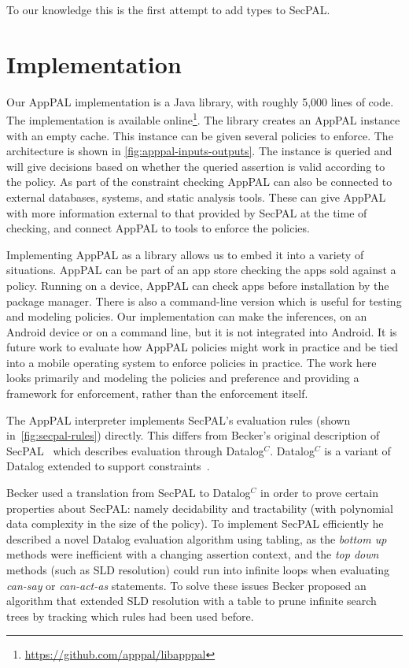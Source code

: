 \documentclass[thesis.tex]{subfiles}
\begin{document}
To our knowledge this is the first attempt to add types to SecPAL.


\section{Implementation}
\label{sec:implementation}

Our AppPAL implementation is a Java library, with roughly 5,000 lines of code.
The implementation is available
online\footnote{\url{https://github.com/apppal/libapppal}}. The library creates
an AppPAL instance with an empty cache. This instance can be given several policies to enforce. The
architecture is shown in \autoref{fig:apppal-inputs-outputs}. The instance is
queried and will give decisions based on whether the queried assertion is valid
according to the policy. As part of the constraint checking AppPAL can also be
connected to external databases, systems, and static analysis tools. These can
give AppPAL with more information external to that provided by SecPAL at the
time of checking, and connect AppPAL to tools to enforce the policies.

Implementing AppPAL as a library allows us to embed it into a variety of
situations. AppPAL can be part of an app store checking the apps sold against a
policy. Running on a device, AppPAL can check apps before installation by the
package manager. There is also a command-line version which is useful for
testing and modeling policies. Our implementation can make the inferences, on
an Android device or on a command line, but it is not integrated into Android. It
is future work to evaluate how AppPAL policies might work in practice and be
tied into a mobile operating system to enforce policies in practice. The work
here looks primarily and modeling the policies and preference and providing a
framework for enforcement, rather than the enforcement itself.

The AppPAL interpreter implements SecPAL's evaluation rules (shown
in~\autoref{fig:secpal-rules}) directly. This differs from Becker's original
description of SecPAL~\cite{becker_secpal:_2006} which describes evaluation
through Datalog$^C$. Datalog$^C$ is a variant of Datalog extended to support
constraints~\cite{li_datalog_2003}. 

Becker used a translation from SecPAL to Datalog$^C$ in order to prove
certain properties about SecPAL: namely decidability and tractability
(with polynomial data complexity in the size of the policy). To
implement SecPAL efficiently he described a novel Datalog evaluation
algorithm using tabling, as the \emph{bottom up} methods were
inefficient with a changing assertion context, and the \emph{top down}
methods (such as SLD resolution) could run into infinite loops when
evaluating \emph{can-say} or \emph{can-act-as} statements. To solve
these issues Becker proposed an algorithm that extended SLD resolution
with a table to prune infinite search trees by tracking which rules
had been used before.
\end{document}
